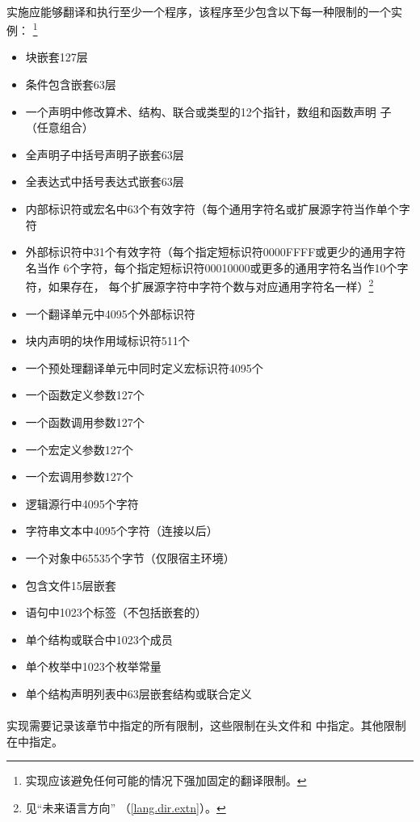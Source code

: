 \paragraph{}
实施应能够翻译和执行至少一个程序，该程序至少包含以下每一种限制的一个实例：
\footnote{实现应该避免任何可能的情况下强加固定的翻译限制。}
\begin{itemize}
  \item{块嵌套127层}
  \item{条件包含嵌套63层}
  \item{一个声明中修改算术、结构、联合或类型的12个指针，数组和函数声明
     子（任意组合）}
  \item{全声明子中括号声明子嵌套63层}
  \item{全表达式中括号表达式嵌套63层}
  \item{内部标识符或宏名中63个有效字符（每个通用字符名或扩展源字符当作单个字符}
  \item{外部标识符中31个有效字符（每个指定短标识符0000FFFF或更少的通用字符名当作
    6个字符，每个指定短标识符00010000或更多的通用字符名当作10个字符，如果存在，
    每个扩展源字符中字符个数与对应通用字符名一样）\footnote{见``未来语言方向''
    （\ref{lang.dir.extn}）。}}
  \item{一个翻译单元中4095个外部标识符}
  \item{块内声明的块作用域标识符511个}
  \item{一个预处理翻译单元中同时定义宏标识符4095个}
  \item{一个函数定义参数127个}
  \item{一个函数调用参数127个}
  \item{一个宏定义参数127个}
  \item{一个宏调用参数127个}
  \item{逻辑源行中4095个字符}
  \item{字符串文本中4095个字符（连接以后）}
  \item{一个对象中65535个字节（仅限宿主环境）}
  \item{包含文件15层嵌套}
  \item{语句中1023个标签（不包括嵌套的）}
  \item{单个结构或联合中1023个成员}
  \item{单个枚举中1023个枚举常量}
  \item{单个结构声明列表中63层嵌套结构或联合定义}
\end{itemize}

\paragraph{}
实现需要记录该章节中指定的所有限制，这些限制在头文件和
中指定。其他限制在中指定。

